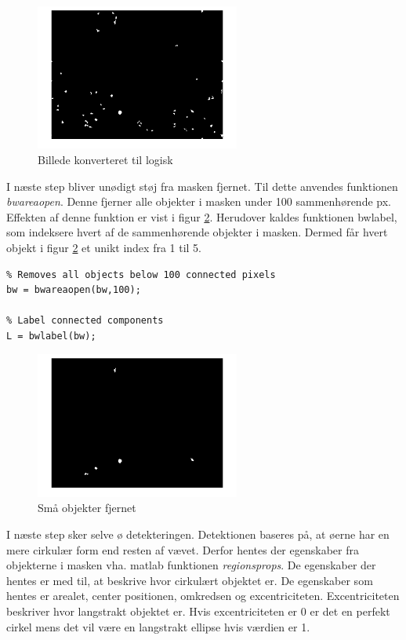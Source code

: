 \begin{figure}[H]
	\centering
	\includegraphics[width=0.6\textwidth]{billeder/software/im2bw.png}
	\caption{Billede konverteret til logisk}
	\label{fig:im2bw}
\end{figure}

I næste step bliver unødigt støj fra masken fjernet. Til dette anvendes funktionen \textit{bwareaopen}. Denne fjerner alle objekter i masken under 100 sammenhørende px. Effekten af denne funktion er vist i figur \ref{fig:bwarea}. Herudover kaldes funktionen bwlabel, som indeksere hvert af de sammenhørende objekter i masken. Dermed får hvert objekt i figur \ref{fig:bwarea} et unikt index fra 1 til 5. 
\begin{lstlisting} 
% Removes all objects below 100 connected pixels
bw = bwareaopen(bw,100);

% Label connected components
L = bwlabel(bw);
\end{lstlisting} 

\begin{figure}[H]
	\centering
	\includegraphics[width=0.6\textwidth]{billeder/software/bwarea.png}
	\caption{Små objekter fjernet}
	\label{fig:bwarea}
\end{figure}

I næste step sker selve ø detekteringen. Detektionen baseres på, at øerne har en mere cirkulær form end resten af vævet. Derfor hentes der egenskaber fra objekterne i masken vha. matlab funktionen \textit{regionsprops}. De egenskaber der hentes er med til, at beskrive hvor cirkulært objektet er. De egenskaber som hentes er arealet, center positionen, omkredsen og excentriciteten. Excentriciteten beskriver hvor langstrakt objektet er. Hvis excentriciteten er 0 er det en perfekt cirkel mens det vil være en langstrakt ellipse hvis værdien er 1.

